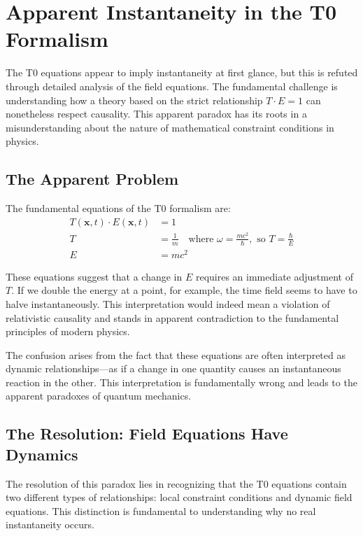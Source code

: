 \documentclass[12pt,a4paper]{article}
\begin{document}
	\section{Apparent Instantaneity in the T0 Formalism}
	
	The T0 equations appear to imply instantaneity at first glance, but this is refuted through detailed analysis of the field equations. The fundamental challenge is understanding how a theory based on the strict relationship $T \cdot E = 1$ can nonetheless respect causality. This apparent paradox has its roots in a misunderstanding about the nature of mathematical constraint conditions in physics.
	
	\subsection{The Apparent Problem}
	
	The fundamental equations of the T0 formalism are:
	\begin{align}
		T(\mathbf{x},t) \cdot E(\mathbf{x},t) &= 1 \label{eq:TE_constraint} \\
		T &= \frac{1}{m} \quad \text{where } \omega = \frac{mc^2}{\hbar}, \text{ so } T = \frac{\hbar}{E} \label{eq:T_definition} \\
		E &= mc^2 \label{eq:E_definition}
	\end{align}
	
	These equations suggest that a change in $E$ requires an immediate adjustment of $T$. If we double the energy at a point, for example, the time field seems to have to halve instantaneously. This interpretation would indeed mean a violation of relativistic causality and stands in apparent contradiction to the fundamental principles of modern physics.
	
	The confusion arises from the fact that these equations are often interpreted as dynamic relationships—as if a change in one quantity causes an instantaneous reaction in the other. This interpretation is fundamentally wrong and leads to the apparent paradoxes of quantum mechanics.
	
	\subsection{The Resolution: Field Equations Have Dynamics}
	
	The resolution of this paradox lies in recognizing that the T0 equations contain two different types of relationships: local constraint conditions and dynamic field equations. This distinction is fundamental to understanding why no real instantaneity occurs.
	
\end{document}
